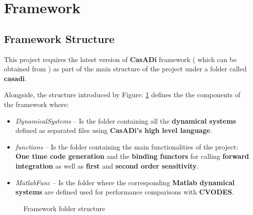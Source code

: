 \documentclass[12pt, letterpaper]{article}
\begin{document}
\section{Framework}
\label{label_framwork}

\subsection{Framework Structure}
\label{label_framework_structure}

This project requires the latest version of \textbf{CasADi} framework ( which can be obtained from \cite{CasADi} ) as part of the main structure of the project under a folder called \textbf{casadi}.

Alongside, the structure introduced by Figure: \ref{label_framework_folder_structure} defines the the components of the framework where:
\begin{itemize}
  \item \textit{DynamicalSystems} -- Is the folder containing all the \textbf{dynamical systems} defined as separated files using \textbf{CasADi's high level language}. 
  \item \textit{functions} -- Is the folder containing the main functionalities of the project: \textbf{One time code generation} and the \textbf{binding functors} for calling \textbf{forward integration} as well as \textbf{first} and \textbf{second order sensitivity}.
  \item \textit{MatlabFunc} -- Is the folder where the corresponding \textbf{Matlab dynamical systems} are defined used for performance comparisons with \textbf{CVODES}. 
\end{itemize} 


\begin{figure}[h]
\centering
{}
\caption{Framework folder structure}
\label{label_framework_folder_structure}
\end{figure}
\end{document}
